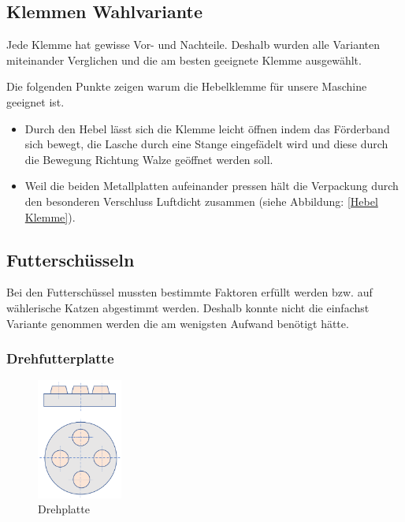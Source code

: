 \subsection{Klemmen Wahlvariante}

Jede Klemme hat gewisse Vor- und Nachteile. Deshalb wurden alle Varianten miteinander Verglichen und die am besten geeignete Klemme ausgewählt.

Die folgenden Punkte zeigen warum die Hebelklemme für unsere Maschine geeignet ist.

\begin{itemize}
\item Durch den Hebel lässt sich die Klemme leicht öffnen indem das Förderband sich bewegt, die Lasche durch eine Stange eingefädelt wird und diese durch die Bewegung Richtung Walze geöffnet werden soll.
\item Weil die beiden Metallplatten aufeinander pressen hält die Verpackung durch den besonderen Verschluss Luftdicht zusammen (siehe Abbildung: \ref{Hebel Klemme}). 

\end{itemize} 

\subsection{Futterschüsseln}

Bei den Futterschüssel mussten bestimmte Faktoren erfüllt werden bzw. auf wählerische Katzen abgestimmt werden. Deshalb konnte nicht die einfachst Variante genommen werden die am wenigsten Aufwand benötigt hätte. 

\subsubsection{Drehfutterplatte}

\begin{figure}
\vspace{-40pt}
  \begin{center}
    \includegraphics[width=0.25\textwidth]{Bilder/Powerpoint/Drehplatte}
  \end{center}
  \caption{Drehplatte}
  \label{Drehplatte}
  \vspace{-20pt}
\end{figure}


